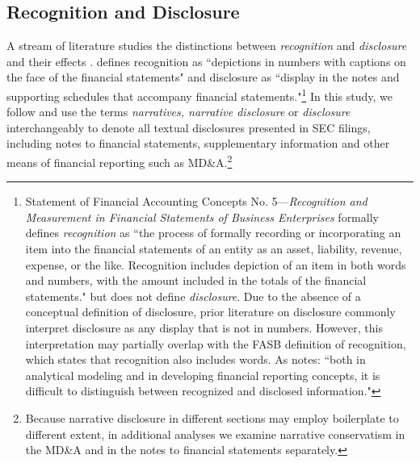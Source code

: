 \documentclass[letterpaper,11pt]{article}
\begin{document}
\begin{spacing}{1.5}
\subsection{Recognition and Disclosure}\label{sec2.1}
\noindent A stream of literature studies the distinctions between \textit{recognition} and \textit{disclosure} and their effects \cite{aboodyRecognitionDisclosureOil1996, barthMarketEffectsRecognition2003, schipperRequiredDisclosuresFinancial2007}.  defines recognition as ``depictions in numbers with captions on the face of the financial statements" and disclosure as ``display in the notes and supporting schedules that accompany financial statements."\footnote{Statement of Financial Accounting Concepts No. 5---\textit{Recognition and Measurement in Financial Statements of Business Enterprises} formally defines \textit{recognition} as ``the process of formally recording or incorporating an item into the financial statements of an entity as an asset, liability, revenue, expense, or the like. Recognition includes depiction of an item in both words and numbers, with the amount included in the totals of the financial statements." \cite[par. 6]{fasbStatementFinancialAccounting1984} but does not define \textit{disclosure}. Due to the absence of a conceptual definition of disclosure, prior literature on disclosure commonly interpret disclosure as any display that is not in numbers. However, this interpretation may partially overlap with the FASB definition of recognition, which states that recognition also includes words. As  notes: ``both in analytical modeling and in developing financial reporting concepts, it is difficult to distinguish between recognized and disclosed information."} In this study, we follow  and use the terms \textit{narratives, narrative disclosure} or \textit{disclosure} interchangeably to denote all textual disclosures presented in SEC filings, including notes to financial statements, supplementary information and other means of financial reporting such as MD\&A.\footnote{Because narrative disclosure in different sections may employ boilerplate to different extent, in additional analyses we examine narrative conservatism in the MD\&A and in the notes to financial statements separately.}


\end{spacing}
\end{document}

